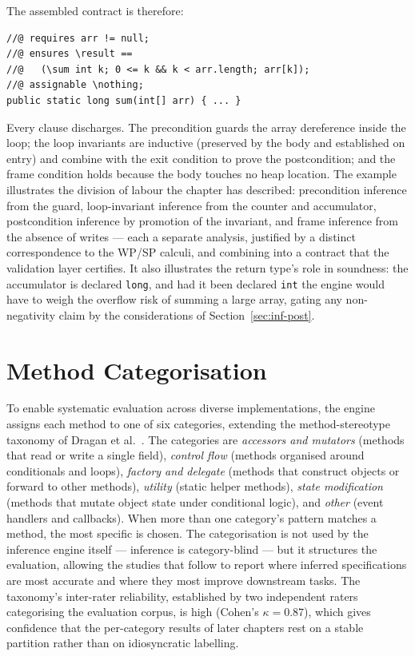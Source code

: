 The assembled contract is therefore:

\begin{lstlisting}
//@ requires arr != null;
//@ ensures \result ==
//@   (\sum int k; 0 <= k && k < arr.length; arr[k]);
//@ assignable \nothing;
public static long sum(int[] arr) { ... }
\end{lstlisting}

Every clause discharges. The precondition guards the array dereference inside the
loop; the loop invariants are inductive (preserved by the body and established on
entry) and combine with the exit condition to prove the postcondition; and the
frame condition holds because the body touches no heap location. The example
illustrates the division of labour the chapter has described: precondition
inference from the guard, loop-invariant inference from the counter and
accumulator, postcondition inference by promotion of the invariant, and frame
inference from the absence of writes --- each a separate analysis, justified by a
distinct correspondence to the WP/SP calculi, and combining into a contract that
the validation layer certifies. It also illustrates the return type's role in
soundness: the accumulator is declared \texttt{long}, and had it been declared
\texttt{int} the engine would have to weigh the overflow risk of summing a large
array, gating any non-negativity claim by the considerations of
Section~\ref{sec:inf-post}.

\section{Method Categorisation}
\label{sec:inf-cat}

To enable systematic evaluation across diverse implementations, the engine
assigns each method to one of six categories, extending the method-stereotype
taxonomy of Dragan et al.~\cite{dragan2006reverse}. The categories are
\emph{accessors and mutators} (methods that read or write a single field),
\emph{control flow} (methods organised around conditionals and loops),
\emph{factory and delegate} (methods that construct objects or forward to other
methods), \emph{utility} (static helper methods), \emph{state modification}
(methods that mutate object state under conditional logic), and \emph{other}
(event handlers and callbacks). When more than one category's pattern matches a
method, the most specific is chosen. The categorisation is not used by the
inference engine itself --- inference is category-blind --- but it structures
the evaluation, allowing the studies that follow to report where inferred
specifications are most accurate and where they most improve downstream tasks.
The taxonomy's inter-rater reliability, established by two independent raters
categorising the evaluation corpus, is high (Cohen's $\kappa = 0.87$), which
gives confidence that the per-category results of later chapters rest on a
stable partition rather than on idiosyncratic labelling.

